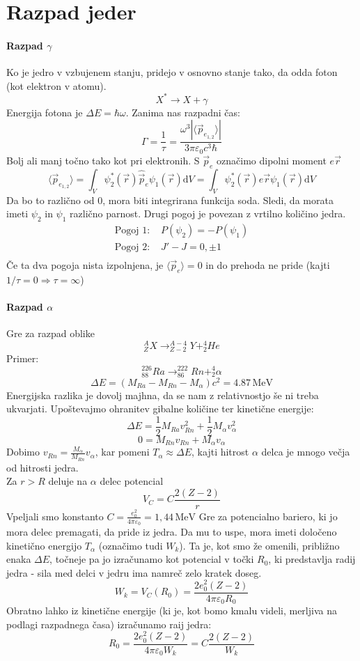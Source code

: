 \documentclass[a4paper]{article}
\newcommand{\vct}[1]{\overrightarrow{#1}}
\newcommand{\dif}{\mathrm{d}}
\newcommand{\avg}[1]{\langle {#1} \rangle}
\begin{document}
\section{Razpad jeder}
\paragraph{Razpad $\gamma$} Ko je jedro v vzbujenem stanju, pridejo v osnovno stanje tako, da odda foton (kot elektron v atomu).
$$X^* \to X + \gamma$$
Energija fotona je $\Delta E = \hbar \omega$. Zanima nas razpadni čas:
$$\Gamma = \frac{1}{\tau} = \frac{\omega^3|\avg{\vct{p}_{e_{1, 2}}}|}{3\pi\varepsilon_0c^3\hbar}$$
Bolj ali manj točno tako kot pri elektronih. S $\vct{p}_e$ označimo dipolni moment $e\vct{r}$
$$\avg{\vct{p}_{e_{1,2}}} = \int_V \psi^*_2(\vct{r})\hat{\vct{p}}_{e}\psi_1(\vct{r}) \dif V = \int_V \psi^*_2(\vct{r})e\vct{r}\psi_1(\vct{r}) \dif V$$
Da bo to različno od 0, mora biti integrirana funkcija soda. Sledi, da morata imeti $\psi_2$ in $\psi_1$ različno parnost. Drugi pogoj je povezan z vrtilno količino jedra.
\begin{align*}
    \text{Pogoj 1:  } & P(\psi_2) = -P(\psi_1) \\
    \text{Pogoj 2:  } & J' - J = 0, \pm 1 \\
\end{align*}
Če ta dva pogoja nista izpolnjena, je $\avg{\vct{p}_e} = 0$ in do prehoda ne pride (kajti $1/\tau = 0 \Rightarrow \tau = \infty$)
\paragraph{Razpad $\alpha$} Gre za razpad oblike
$$^A_ZX \to ^{A-4}_{Z-2}Y + ^4_2He$$
Primer:
$$^{226}_{88}Ra \to ^{222}_{86}Rn + ^{4}_{2}\alpha$$
$$\Delta E = (M_{Ra} - M_{Rn} - M_{\alpha})c^2 = 4.87\,\text{MeV}$$
Energijska razlika je dovolj majhna, da se nam z relativnostjo še ni treba ukvarjati. Upoštevajmo ohranitev gibalne količine ter kinetične energije:
$$\Delta E = \frac{1}{2}M_{Ra}v^2_{Rn} + \frac{1}{2}M_{\alpha}v^2_{\alpha}$$
$$0 = M_{Rn} v_{Rn} + M_{\alpha}v_{\alpha}$$
Dobimo $\displaystyle{v_{Rn} = \frac{M_\alpha}{M_{Rn}}v_{\alpha}}$,
kar pomeni $T_\alpha \approx \Delta E$, kajti hitrost $\alpha$ delca je mnogo večja od hitrosti jedra. \\[3mm]
Za \(r > R\) deluje na \(\alpha\) delec potencial \[V_C = C\frac{2(Z-2)}{r}\]
Vpeljali smo konstanto \(\displaystyle{C = \frac{e_0^2}{4\pi\varepsilon_0}} = 1,44\,\mathrm{MeV}\)
Gre za potencialno bariero, ki jo mora delec premagati, da pride iz jedra. Da mu to uspe, mora imeti določeno kinetično energijo \(T_\alpha\) (označimo tudi \(W_k\)). Ta je, kot smo že omenili, približno enaka \(\Delta E\),
točneje pa jo izračunamo kot potencial v točki \(R_0\), ki predstavlja radij jedra - sila med delci v jedru ima namreč zelo kratek doseg.
\[W_k = V_C(R_0) = \frac{2e_0^2(Z-2)}{4\pi\varepsilon_0R_0}\]
Obratno lahko iz kinetične energije (ki je, kot bomo kmalu videli, merljiva na podlagi razpadnega časa) izračunamo raij jedra:
\[R_0 = \frac{2e_0^2(Z-2)}{4\pi\varepsilon_0W_k} = C\frac{2(Z-2)}{W_k}\]
\end{document}
